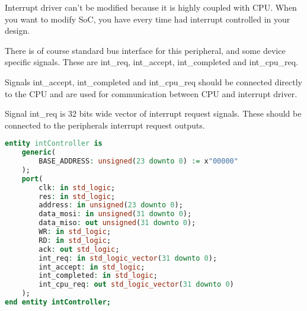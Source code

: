 Interrupt driver can't be modified because it is highly coupled with CPU. When
you want to modify SoC, you have every time had interrupt controlled in your design.

There is of course standard bus interface for this peripheral, and some device
specific signals. These are int\_req, int\_accept, int\_completed and int\_cpu\_req.

Signals int\_accept, int\_completed and int\_cpu\_req should be connected directly
to the CPU and are used for communication between CPU and interrupt driver.

Signal int\_req is 32 bits wide vector of interrupt request signals. These should be
connected to the peripherals interrupt request outputs.

\begin{lstlisting}[language=VHDL, frame=single]
entity intController is
    generic(
        BASE_ADDRESS: unsigned(23 downto 0) := x"00000"
    );
    port(
        clk: in std_logic;
        res: in std_logic;
        address: in unsigned(23 downto 0);
        data_mosi: in unsigned(31 downto 0);
        data_miso: out unsigned(31 downto 0);
        WR: in std_logic;
        RD: in std_logic;
        ack: out std_logic;
        int_req: in std_logic_vector(31 downto 0);
        int_accept: in std_logic;
        int_completed: in std_logic;
        int_cpu_req: out std_logic_vector(31 downto 0)
    );
end entity intController;
\end{lstlisting}

